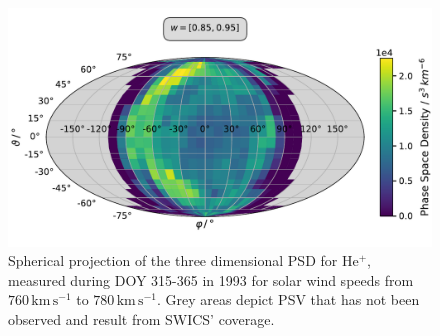\begin{figure}[h]
	\includegraphics[width=1\textwidth]{Figures/sky_ps.pdf}
	\centering
	\caption{Spherical projection of the three dimensional PSD for $\mathrm{He^{+}}$, measured during DOY 315-365 in 1993 for solar wind speeds from $760 \, \mathrm{km\,s^{-1}}$ to $780 \, \mathrm{km\,s^{-1}}$. Grey areas depict PSV that has not been observed and result from SWICS' coverage.}
	\label{fig:sky_psd}
\end{figure}
%
%
%
\clearpage
